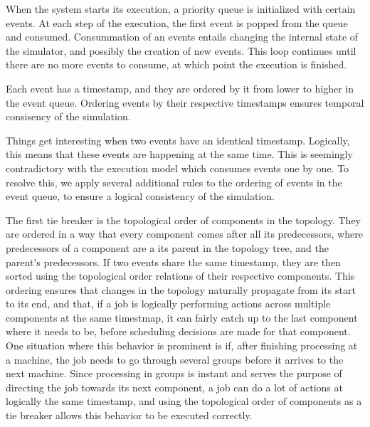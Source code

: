 
When the system starts its execution, a priority queue is initialized with certain events. At each step of the execution, the first event is popped from the queue and consumed. Consummation of an events entails changing the internal state of the simulator, and possibly the creation of new events. This loop continues until there are no more events to consume, at which point the execution is finished. 

Each event has a timestamp, and they are ordered by it from lower to higher in the event queue. Ordering events by their respective timestamps ensures temporal consisency of the simulation.

Things get interesting when two events have an identical timestamp. Logically, this means that these events are happening at the same time. This is seemingly contradictory with the execution model which consumes events one by one. To resolve this, we apply several additional rules to the ordering of events in the event queue, to ensure a logical consistency of the simulation.

The first tie breaker is the topological order of components in the topology. They are ordered in a way that every component comes after all its predecessors, where predecessors of a component are a its parent in the topology tree, and the parent's predecessors. If two events share the same timestamp, they are then sorted using the topological order relations of their respective components. This ordering ensures that changes in the topology naturally propagate from its start to its end, and that, if a job is logically performing actions across multiple components at the same timestmap, it can fairly catch up to the last component where it needs to be, before scheduling decisions are made for that component. One situation where this behavior is prominent is if, after finishing processing at a machine, the job needs to go through several groups before it arrives to the next machine. Since processing in groups is instant and serves the purpose of directing the job towards its next component, a job can do a lot of actions at logically the same timestamp, and using the topological order of components as a tie breaker allows this behavior to be executed correctly.

